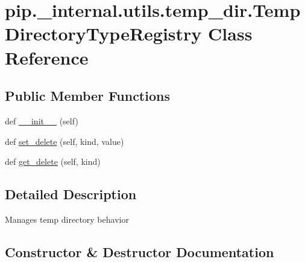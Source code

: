 \hypertarget{classpip_1_1__internal_1_1utils_1_1temp__dir_1_1TempDirectoryTypeRegistry}{}\section{pip.\+\_\+internal.\+utils.\+temp\+\_\+dir.\+Temp\+Directory\+Type\+Registry Class Reference}
\label{classpip_1_1__internal_1_1utils_1_1temp__dir_1_1TempDirectoryTypeRegistry}
\subsection*{Public Member Functions}
\begin{DoxyCompactItemize}
\item 
def \hyperlink{classpip_1_1__internal_1_1utils_1_1temp__dir_1_1TempDirectoryTypeRegistry_a6a7fdbbfab26e5dae33e2386faa4bbd5}{\+\_\+\+\_\+init\+\_\+\+\_\+} (self)
\item 
def \hyperlink{classpip_1_1__internal_1_1utils_1_1temp__dir_1_1TempDirectoryTypeRegistry_acc4e6710277705511305557e7a4b478f}{set\+\_\+delete} (self, kind, value)
\item 
def \hyperlink{classpip_1_1__internal_1_1utils_1_1temp__dir_1_1TempDirectoryTypeRegistry_ab73e5a357df66597499c8ba75ef8290a}{get\+\_\+delete} (self, kind)
\end{DoxyCompactItemize}


\subsection{Detailed Description}
\begin{DoxyVerb}Manages temp directory behavior\end{DoxyVerb}
 

\subsection{Constructor \& Destructor Documentation}
\mbox{\label{classpip_1_1__internal_1_1utils_1_1temp__dir_1_1TempDirectoryTypeRegistry_a6a7fdbbfab26e5dae33e2386faa4bbd5}} 
